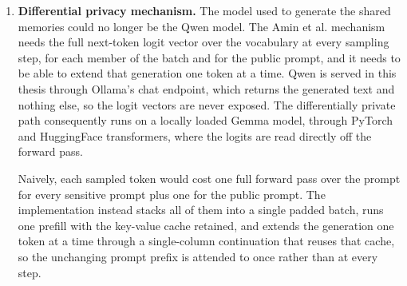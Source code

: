 \begin{enumerate}
    Since the thesis aim was not to assess overall success rates, but a
    comparative assessment instead, the overall intelligence of the model was
    not as important. Published zero-shot success rates for open-weight models
    at or below 8 billion parameters on the full 812-task benchmark span
    roughly 2\% to 24\%, and that spread is driven at least as much by the
    agent harness, the observation format and the prompting strategy as by the
    model itself \citep{zhang2025symbiotic, gandhi2026gobrowse, lu2026distillation}.
    The closest published reference point for the configuration used here is
    \citet{lu2026distillation}, who report the same Qwen3.5 4bn model at 24.1\%
    on the full 812 tasks under the BrowserGym evaluation protocol, without
    fine-tuning. That figure is a useful target rather than a prediction, since
    the harness differs from the one built for this thesis. While a low
    absolute success rate would narrow the base of tasks on which a difference
    between configurations can show, it would not undermine the comparison,
    which holds the model fixed and varies only the memory condition.

    The model is served locally through an Ollama endpoint. Ollama runs the
    quantised weights as a local HTTP service, so each runner calls one chat
    endpoint rather than loading its own copy of the model, and no request
    leaves the machine. Its chat endpoint returns the generated text and
    nothing else, which becomes the deciding constraint for the differentially
    private path below.

    \item \textbf{Differential privacy mechanism.} The model used to generate
    the shared memories could no longer be the Qwen model. The Amin et al.
    mechanism needs the full next-token logit vector over the vocabulary at
    every sampling step, for each member of the batch and for the public
    prompt, and it needs to be able to extend that generation one token at a
    time. Qwen is served in this thesis through Ollama's chat endpoint, which
    returns the generated text and nothing else, so the logit vectors are never
    exposed. The differentially private path consequently runs on a locally
    loaded Gemma model, through PyTorch and HuggingFace transformers, where the
    logits are read directly off the forward pass.

    Naively, each sampled token would cost one full forward pass over the
    prompt for every sensitive prompt plus one for the public prompt. The
    implementation instead stacks all of them into a single padded batch, runs
    one prefill with the key-value cache retained, and extends the generation
    one token at a time through a single-column continuation that reuses that
    cache, so the unchanging prompt prefix is attended to once rather than at
    every step.


\end{enumerate}
